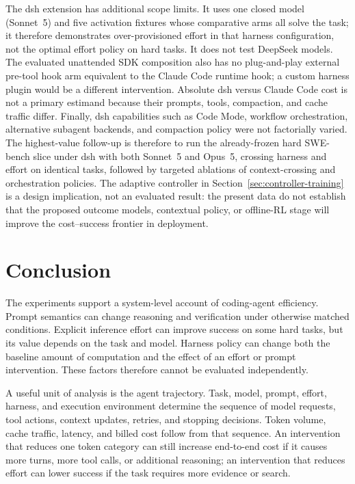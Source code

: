 \documentclass[11pt]{article}
\newcommand{\cc}{Claude Code}
\begin{document}
The dsh extension has additional scope limits. It uses one closed model
(Sonnet~5) and five activation fixtures whose comparative arms all solve the
task; it therefore demonstrates over-provisioned effort in that harness
configuration, not the optimal effort policy on hard tasks. It does not test
DeepSeek models. The evaluated unattended SDK composition also has no
plug-and-play external pre-tool hook arm equivalent to the \cc{} runtime hook;
a custom harness plugin would be a different intervention. Absolute dsh versus
\cc{} cost is not a primary estimand because their prompts, tools, compaction,
and cache traffic differ. Finally, dsh capabilities such as Code Mode,
workflow orchestration, alternative subagent backends, and compaction policy
were not factorially varied. The highest-value follow-up is therefore to run
the already-frozen hard SWE-bench slice under dsh with both Sonnet~5 and
Opus~5, crossing harness and effort on identical tasks, followed by targeted
ablations of context-crossing and orchestration policies. The adaptive
controller in Section~\ref{sec:controller-training} is a design implication,
not an evaluated result: the present data do not establish that the proposed
outcome models, contextual policy, or offline-RL stage will improve the
cost--success frontier in deployment.

\section{Conclusion}
The experiments support a system-level account of coding-agent efficiency.
Prompt semantics can change reasoning and verification under otherwise matched
conditions. Explicit inference effort can improve success on some hard tasks,
but its value depends on the task and model. Harness policy can change both the
baseline amount of computation and the effect of an effort or prompt
intervention. These factors therefore cannot be evaluated independently.

A useful unit of analysis is the agent trajectory. Task, model, prompt, effort,
harness, and execution environment determine the sequence of model requests,
tool actions, context updates, retries, and stopping decisions. Token volume,
cache traffic, latency, and billed cost follow from that sequence. An
intervention that reduces one token category can still increase end-to-end cost
if it causes more turns, more tool calls, or additional reasoning; an
intervention that reduces effort can lower success if the task requires more
evidence or search.
\end{document}
